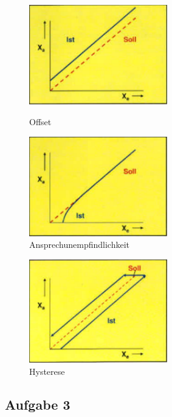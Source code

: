 \begin{center}
    \begin{figure}[h]
        \begin{minipage}[hbt]{7cm}
            \includegraphics[width=6cm]{Kl112b_3.png}
            \caption{Offset}
        \end{minipage}
        \begin{minipage}[hbt]{7cm}
            \includegraphics[width=6cm]{Kl112b_4.png}
            \caption{Ansprechunempfindlichkeit}
        \end{minipage}
    \end{figure}
\end{center}

\begin{center}
    \begin{figure}[h]
        \begin{minipage}[hbt]{7cm}
            \includegraphics[width=6cm]{Kl112b_5.png}
            \caption{Hysterese}
        \end{minipage}
    \end{figure}
\end{center}


\subsection{Aufgabe 3}

